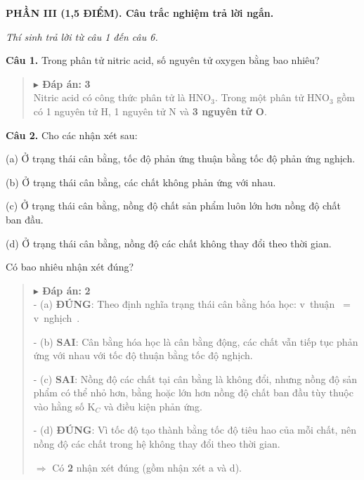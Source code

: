 \documentclass[11pt,a4paper]{article}
\begin{document}
\vspace{6pt}
{\color{myGreen}\bfseries\large PHẦN III (1,5 ĐIỂM). Câu trắc nghiệm trả lời ngắn.}

\textit{\small Thí sinh trả lời từ câu 1 đến câu 6.}
\vspace{3pt}

\textbf{Câu 1.} Trong phân tử nitric acid, số nguyên tử oxygen bằng bao nhiêu?


\begin{quote}\small
{\color{myBlue}\textbf{$\blacktriangleright$ Đáp án:}} \textbf{\color{red} 3}\\
Nitric acid có công thức phân tử là HNO$_{3}$. Trong một phân tử HNO$_{3}$ gồm có 1 nguyên tử H, 1 nguyên tử N và \textbf{3 nguyên tử O}.
\end{quote}
\vspace{2pt}

\textbf{Câu 2.} Cho các nhận xét sau:

(a) Ở trạng thái cân bằng, tốc độ phản ứng thuận bằng tốc độ phản ứng nghịch.

(b) Ở trạng thái cân bằng, các chất không phản ứng với nhau.

(c) Ở trạng thái cân bằng, nồng độ chất sản phẩm luôn lớn hơn nồng độ chất ban đầu.

(d) Ở trạng thái cân bằng, nồng độ các chất không thay đổi theo thời gian.

Có bao nhiêu nhận xét đúng?


\begin{quote}\small
{\color{myBlue}\textbf{$\blacktriangleright$ Đáp án:}} \textbf{\color{red} 2}\\
- (a) \textbf{ĐÚNG}: Theo định nghĩa trạng thái cân bằng hóa học: v~thuận~ = v~nghịch~.

- (b) \textbf{SAI}: Cân bằng hóa học là cân bằng động, các chất vẫn tiếp tục phản ứng với nhau với tốc độ thuận bằng tốc độ nghịch.

- (c) \textbf{SAI}: Nồng độ các chất tại cân bằng là không đổi, nhưng nồng độ sản phẩm có thể nhỏ hơn, bằng hoặc lớn hơn nồng độ chất ban đầu tùy thuộc vào hằng số K$_{C}$ và điều kiện phản ứng.

- (d) \textbf{ĐÚNG}: Vì tốc độ tạo thành bằng tốc độ tiêu hao của mỗi chất, nên nồng độ các chất trong hệ không thay đổi theo thời gian.

$\Rightarrow$ Có \textbf{2} nhận xét đúng (gồm nhận xét a và d).
\end{quote}
\vspace{2pt}
\end{document}
